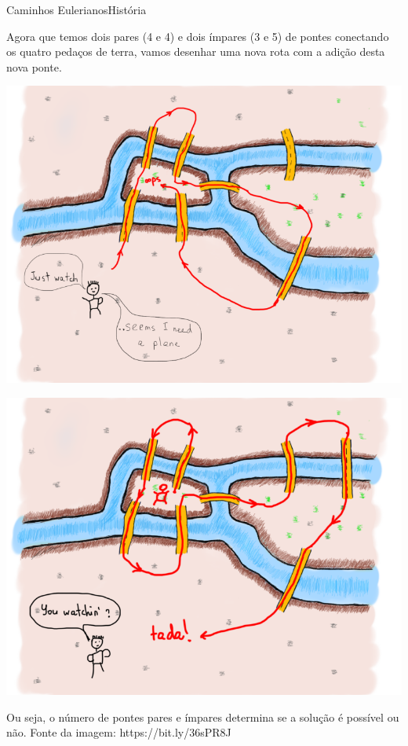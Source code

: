 \documentclass[t]{beamer}
\begin{document}
\begin{ftst}{Caminhos Eulerianos}{História}

Agora que temos dois pares (4 e 4) e dois ímpares (3 e 5) de pontes conectando os quatro pedaços de terra, vamos desenhar uma nova rota com a adição desta nova ponte.

\begin{minipage}{.5\textwidth}
    \centering
    \includegraphics[scale=0.22]{Figuras/euleriano_3.png}
\end{minipage}%
\hfill
\begin{minipage}{.5\textwidth}
    \centering
    \includegraphics[scale=0.22]{Figuras/euleriano_4.png}
\end{minipage}

Ou seja, o número de pontes pares e ímpares determina se a solução é possível ou não.
\vone
\tiny
Fonte da imagem: \hypertarget{clique aqui.}{https://bit.ly/36sPR8J}
\end{ftst}
\end{document}
